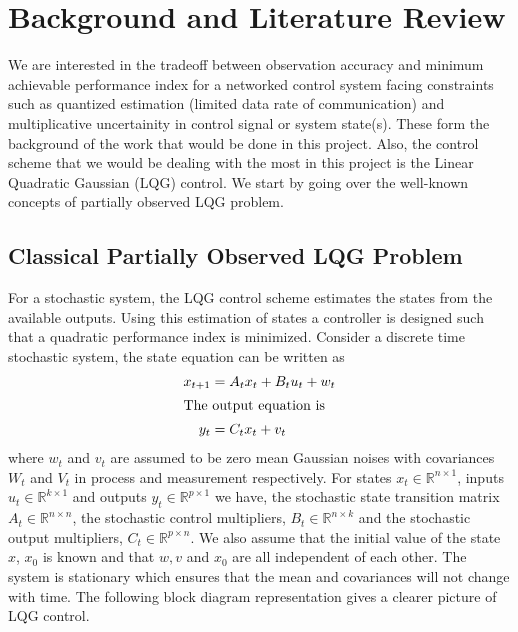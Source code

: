 \documentclass[a4paper,12pt]{article}
\begin{document}
\section{Background and Literature Review}
We are interested in the tradeoff between observation accuracy and minimum achievable performance index for a networked control system facing constraints such as quantized estimation (limited data rate of communication) and multiplicative uncertainity in control signal or system state(s). These form the background of the work that would be done in this project. Also, the control scheme that we would be dealing with the most in this project is the Linear Quadratic Gaussian (LQG) control. We start by going over the well-known concepts of partially observed LQG problem.
	\subsection{Classical Partially Observed LQG Problem}
	For a stochastic system, the LQG control scheme estimates the states from the available outputs. Using this estimation of states a controller is designed such that a quadratic performance index is minimized. Consider a discrete time stochastic system, the state equation can be written as
	\begin{align}
	x_{t+1} &= A_{t}x_{t}+ B_{t}u_{t} + w_{t}\\
	\intertext{The output equation is}
	y_{t}&=C_{t}x_{t}+v_{t}
	\end{align}
	where $w_{t}$ and $v_{t}$ are assumed to be zero mean Gaussian noises with covariances $W_{t}$ and $V_{t}$ in process and measurement respectively. For states $x_{t} \in \mathbb{R}^{n \times 1}$, inputs $u_{t} \in \mathbb{R}^{k \times 1}$ and outputs $y_{t} \in \mathbb{R}^{p \times 1}$ we have, the stochastic state transition matrix $A_{t} \in \mathbb{R}^{n \times n}$, the stochastic control multipliers, $B_{t} \in \mathbb{R}^{n \times k}$ and the stochastic output multipliers, $C_{t} \in \mathbb{R}^{p \times n}$. We also assume that the initial value of the state $x$, $x_{0}$ is known and that $w,v$ and $x_{0}$ are all independent of each other. The system is stationary which ensures that the mean and covariances will not change with time. The following block diagram representation gives a clearer picture of LQG control.
\end{document}
